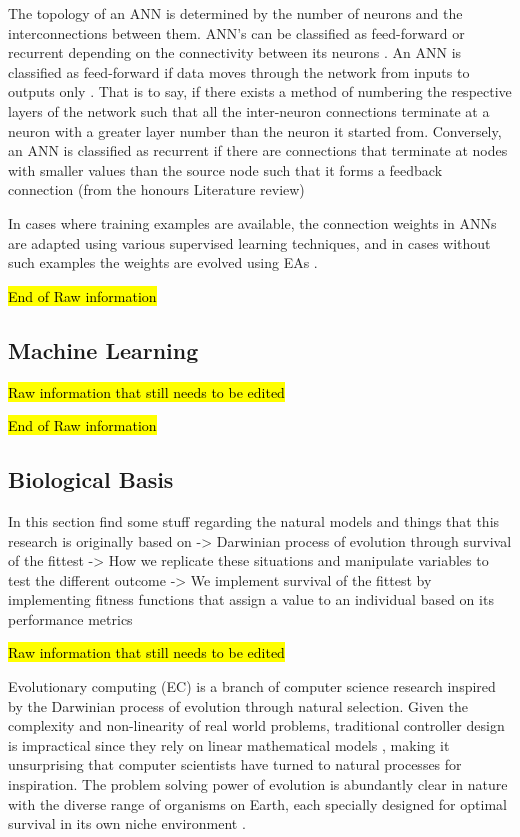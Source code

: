 \documentclass[conference]{IEEEtran}
\begin{document}
The topology of an ANN is determined by the number of neurons and the interconnections between them\cite{floreano2008neuroevolution}. ANN's can be classified as feed-forward or recurrent depending on the connectivity between its neurons \cite{RefWorks:1}. An ANN is classified as feed-forward if data moves through the network from inputs to outputs only \cite{RefWorks:32}. That is to say, if there exists a method of numbering the respective layers of the network such that all the inter-neuron connections terminate at a neuron with a greater layer number than the neuron it started from. Conversely, an ANN is classified as recurrent if there are connections that terminate at nodes with smaller values than the source node such that it forms a feedback connection \cite{RefWorks:31,RefWorks:1} (from the honours Literature review)

In cases where training examples are available, the connection weights in ANNs are adapted using various supervised learning techniques, and in cases without such examples the weights are evolved using EAs \cite{dayhoff2001artificial,RefWorks:1}.

\hl{End of Raw information}

\subsection{Machine Learning}

\hl{Raw information that still needs to be edited}

\hl{End of Raw information}

\subsection{Biological Basis}
In this section find some stuff regarding the natural models and things that this research is originally based on
-> Darwinian process of evolution through survival of the fittest
-> How we replicate these situations and manipulate variables to test the different outcome
-> We implement survival of the fittest by implementing fitness functions that assign a value to an individual based on its performance metrics

\hl{Raw information that still needs to be edited}

Evolutionary computing (EC) is a branch of computer science research inspired by the Darwinian process of evolution through natural selection\cite{RefWorks:33}. Given the complexity and non-linearity of real world problems, traditional controller design is impractical since they rely on linear mathematical models \cite{RefWorks:32}, making it unsurprising that computer scientists have turned to natural processes for inspiration. The problem solving power of evolution is abundantly clear in nature with the diverse range of organisms on Earth, each specially designed for optimal survival in its own niche environment \cite{RefWorks:33}.
\end{document}
